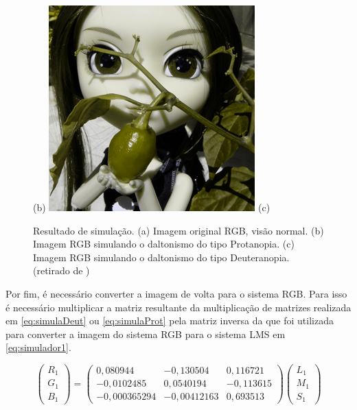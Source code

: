 \documentclass[	12pt, Times, openright, twoside, a4paper, english, brazil]{abntex2}
\begin{document}
\begin{figure}[!htb]
(b)
\endminipage\hfill
{}%
\centering
{\includegraphics[width=\linewidth]{figuraSimuladorDeutan.png}}
(c)
\endminipage
\caption{Resultado de simulação. (a) Imagem original RGB, visão normal. (b) Imagem RGB simulando o daltonismo do tipo Protanopia. (c) Imagem RGB simulando o daltonismo do tipo Deuteranopia. (retirado de  )}
\label{fig:figuraSimulador}
\end{figure}

Por fim, é necessário converter a imagem de volta para o sistema RGB. Para isso é necessário multiplicar a matriz resultante da multiplicação de matrizes realizada em \ref{eq:simulaDeut} ou \ref{eq:simulaProt} pela matriz inversa da que foi utilizada para converter a imagem do sistema RGB para o sistema LMS em \ref{eq:simulador1}.

\begin{equation}
\left(\begin{array}{ccc}
R_1\\G_1\\B_1
\end{array}\right)
=
\left(\begin{array}{ccc}
0,080944 & -0,130504 & 0,116721 \\
-0,0102485 & 0,0540194 & -0,113615 \\
-0,000365294 & -0,00412163 & 0,693513
\end{array}\right)
\left(\begin{array}{ccc}
L_1\\M_1\\S_1
\end{array}\right)
\label{eq:simulador2}
\end{equation}
\end{document}
